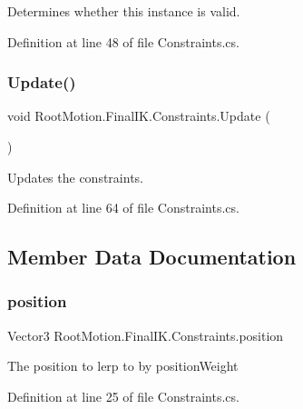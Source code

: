 Determines whether this instance is valid. 



Definition at line 48 of file Constraints.\+cs.

\mbox{\label{class_root_motion_1_1_final_i_k_1_1_constraints_a4e32238714047643472777aab04b502d}} 
\subsubsection{\texorpdfstring{Update()}{Update()}}
{\footnotesize\ttfamily void Root\+Motion.\+Final\+I\+K.\+Constraints.\+Update (\begin{DoxyParamCaption}{ }\end{DoxyParamCaption})}



Updates the constraints. 



Definition at line 64 of file Constraints.\+cs.



\subsection{Member Data Documentation}
\mbox{\label{class_root_motion_1_1_final_i_k_1_1_constraints_a65b8b74ef18ef43c8813b8415536b442}} 
\subsubsection{\texorpdfstring{position}{position}}
{\footnotesize\ttfamily Vector3 Root\+Motion.\+Final\+I\+K.\+Constraints.\+position}



The position to lerp to by position\+Weight 



Definition at line 25 of file Constraints.\+cs.


